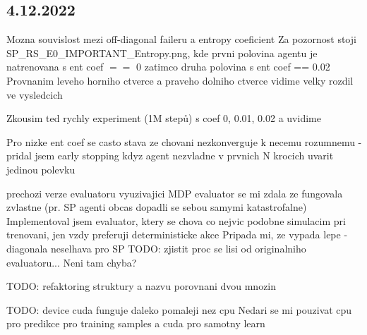 \documentclass{report}
\begin{document}
\subsection*{4.12.2022}
\begin{list}{}{}
    \item Mozna souvislost mezi off-diagonal faileru a entropy coeficient
        Za pozornost stoji SP\_RS\_E0\_IMPORTANT\_Entropy.png,  kde prvni polovina agentu je natrenovana s ent coef $==$ 0
        zatimco druha polovina s ent coef == 0.02
        Provnanim leveho horniho ctverce a praveho dolniho ctverce vidime velky rozdil ve vysledcich
    \item Zkousim ted rychly experiment (1M stepů) s coef 0, 0.01, 0.02 a uvidime
    \item Pro nizke ent coef se casto stava ze chovani nezkonverguje k necemu rozumnemu - 
        pridal jsem early stopping kdyz agent nezvladne v prvnich N krocich uvarit jedinou polevku
    \item prechozi verze evaluatoru vyuzivajici MDP evaluator se mi zdala ze fungovala zvlastne (pr. SP agenti obcas dopadli se sebou samymi katastrofalne)
        Implementoval jsem evaluator, ktery se chova co nejvic podobne simulacim pri trenovani, jen vzdy preferuji deterministicke akce
        Pripada mi, ze vypada lepe - diagonala neselhava pro SP
        TODO: zjistit proc se lisi od originalniho evaluatoru... Neni tam chyba?
    \item TODO: refaktoring struktury a nazvu porovnani dvou mnozin
    \item TODO: device cuda funguje daleko pomaleji nez cpu
        Nedari se mi pouzivat cpu pro predikce pro training samples a cuda pro samotny learn


\end{list}
\end{document}
